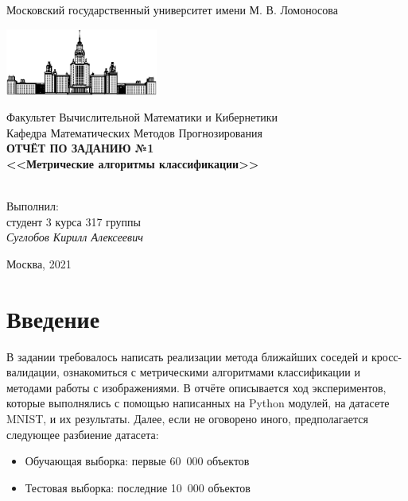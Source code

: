 \documentclass[12pt]{article}
\begin{document}
\begin{titlepage}
\begin{center}
    Московский государственный университет имени М. В. Ломоносова

    \bigskip
    \includegraphics[width=50mm]{msu.eps}

    \bigskip
    Факультет Вычислительной Математики и Кибернетики\\
    Кафедра Математических Методов Прогнозирования\\[10mm]

    \textsf{\large\bfseries
        ОТЧЁТ ПО ЗАДАНИЮ №1\\[10mm]
        <<Метрические алгоритмы классификации>>\\
    }\\[10mm]

    \begin{flushright}
        \parbox{0.5\textwidth}{
        	Выполнил:\\
        	студент 3 курса 317 группы \\
        	\emph{Суглобов Кирилл Алексеевич}\\[5mm]
        }
    \end{flushright}

    \vspace{\fill}
    Москва, 2021
\end{center}
\end{titlepage}
\tableofcontents

\section{Введение}
В задании требовалось написать реализации метода ближайших соседей и кросс-валидации, ознакомиться с метрическими алгоритмами классификации и методами работы с изображениями. В отчёте описывается ход экспериментов, которые выполнялись с помощью написанных на Python модулей, на датасете MNIST, и их результаты.
Далее, если не оговорено иного, предполагается следующее разбиение датасета:
\begin{itemize}
  \item Обучающая выборка: первые 60~000 объектов
  \item Тестовая выборка: последние 10~000 объектов
\end{itemize}
\end{document}
